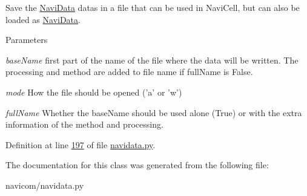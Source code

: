 Save the \hyperlink{classnavicom_1_1navidata_1_1NaviData}{NaviData} datas in a file that can be used in NaviCell, but can also be loaded as \hyperlink{classnavicom_1_1navidata_1_1NaviData}{NaviData}. 


\begin{DoxyParams}{Parameters}
\item[{\em baseName}]first part of the name of the file where the data will be written. The processing and method are added to file name if fullName is False. \item[{\em mode}]How the file should be opened ('a' or 'w') \item[{\em fullName}]Whether the baseName should be used alone (True) or with the extra information of the method and processing. \end{DoxyParams}


Definition at line \hyperlink{navidata_8py_source_l00197}{197} of file \hyperlink{navidata_8py_source}{navidata.py}.



The documentation for this class was generated from the following file:\begin{DoxyCompactItemize}
\item 
navicom/navidata.py\end{DoxyCompactItemize}
